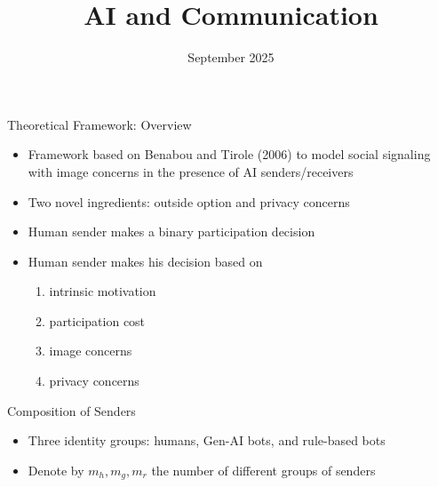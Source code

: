 \documentclass[11pt,aspectratio=169]{beamer}
\author[Ash, Lou, Song]{%
    \texorpdfstring{%
    \begin{columns}
        \column{.3333\linewidth}
        \centering
        Elliot Ash \\\vspace{.5em} \small ETH Zurich
        \column{.3333\linewidth}
        \centering
        Yichuan Lou \\\vspace{.5em} \small UTokyo
        \column{.3333\linewidth}
        \centering
        Lena Song \\\vspace{.5em} \small UIUC
    \end{columns}}{Elliot Ash, Yichuan Lou, Lena Song}
}
\title[AI and Communication]{AI and Communication}
\date[Conference Name]{September 2025}
\begin{document}
\begin{frame}[plain]
    \titlepage
\end{frame}




\begin{frame}{Theoretical Framework: Overview}

\begin{itemize}\setlength{\itemsep}{1em}
    \item Framework based on Benabou and Tirole (2006) to model social signaling with image concerns in the presence of AI senders/receivers
    \item Two novel ingredients: outside option and privacy concerns
    \item Human sender makes a binary participation decision 
    \item Human sender makes his decision based on
    \begin{enumerate}
        \item intrinsic motivation
        \item participation cost
        \item image concerns
        \item privacy concerns
    \end{enumerate}
\end{itemize}
    
\end{frame}



\begin{frame}{Composition of Senders}

\begin{itemize}
    \item Three identity groups: humans, Gen-AI bots, and rule-based bots
    \item Denote by $m_h,m_g,m_r$ the number of different groups of senders 
\end{itemize}
    
\end{frame}
\end{document}
